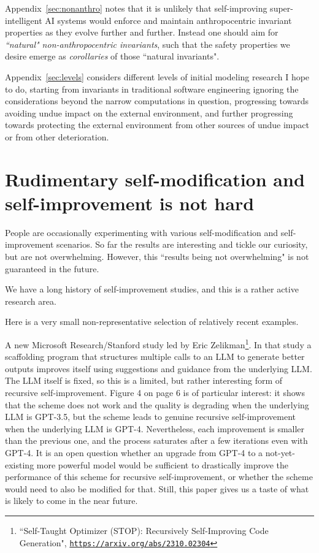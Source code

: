 \documentclass{article}
\begin{document}
Appendix~\ref{sec:nonanthro} notes that it is unlikely that self-improving super-intelligent AI systems would
enforce and maintain anthropocentric invariant properties as they evolve further and further. Instead one
should aim for {\em ``natural" non-anthropocentric invariants}, such that the safety properties we desire emerge as
{\em corollaries} of those ``natural invariants".

Appendix~\ref{sec:levels} considers different levels of initial modeling research I hope to do, starting from invariants in
traditional software engineering ignoring the considerations beyond the narrow computations in question,
progressing towards avoiding undue impact on the external environment, and further progressing towards
protecting the external environment from other sources of undue impact or from other deterioration.

\section{Rudimentary self-modification and self-improvement is not hard}\label{sec:selfmod}

People are occasionally experimenting with various self-modification and self-improvement scenarios.
So far the results are interesting and tickle our curiosity, but are not overwhelming. However, this 
``results being not overwhelming" is not guaranteed in the future.

We have a long history of self-improvement studies, and this is a rather active research area. 

Here is a very small non-representative selection of relatively recent examples.

A new Microsoft Research/Stanford study led by Eric Zelikman\footnote{``Self-Taught Optimizer (STOP): 
Recursively Self-Improving Code Generation", \href{https://arxiv.org/abs/2310.02304}{\tt https://arxiv.org/abs/2310.02304}}.
In that study a scaffolding program that structures multiple calls to an LLM to generate better outputs
improves itself using suggestions and guidance from the underlying LLM. The LLM itself is fixed, so this
is a limited, but rather interesting form of recursive self-improvement. Figure 4 on page 6 is of particular interest:
it shows that the scheme does not work and the quality is degrading when the underlying LLM is GPT-3.5, but
the scheme leads to genuine recursive self-improvement when the underlying LLM is GPT-4. Nevertheless,
each improvement is smaller than the previous one, and the process saturates after a few iterations even with GPT-4.
It is an open question whether an upgrade from GPT-4 to a not-yet-existing more powerful model would be
sufficient to drastically improve the performance of this scheme for recursive self-improvement, or whether the
scheme would need to also be modified for that. Still, this paper gives us a taste of what is likely to come in the near
future.
\end{document}

